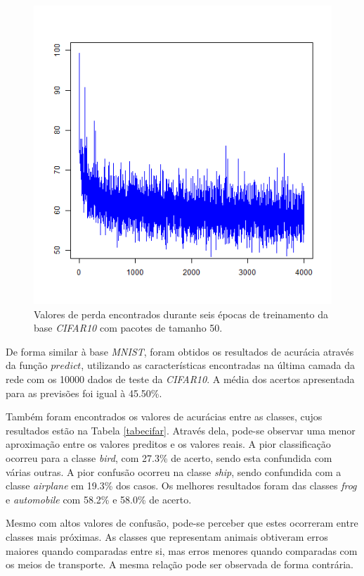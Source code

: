 \documentclass[conference]{IEEEtran}
\begin{document}
\begin{figure}[h]
\centerline{\includegraphics[width=.8\columnwidth]{fig/L_cifar10.png}}
\caption{Valores de perda encontrados durante seis épocas de treinamento da base \textit{CIFAR10} com pacotes de tamanho 50.}
\label{figlcifar}
\end{figure}

De forma similar à base \textit{MNIST}, foram obtidos os resultados de acurácia através da função $predict$, utilizando as características encontradas na última camada da rede com os 10000 dados de teste da \textit{CIFAR10}. A média dos acertos apresentada para as previsões foi igual à 45.50\%.

Também foram encontrados os valores de acurácias entre as classes, cujos resultados estão na Tabela \ref{tabecifar}. Através dela, pode-se observar uma menor aproximação entre os valores preditos e os valores reais. A pior classificação ocorreu para a classe \textit{bird}, com 27.3\% de acerto, sendo esta confundida com várias outras. A pior confusão ocorreu na classe \textit{ship}, sendo confundida com a classe \textit{airplane} em 19.3\% dos casos. Os melhores resultados foram das classes \textit{frog} e \textit{automobile} com 58.2\% e 58.0\% de acerto.

Mesmo com altos valores de confusão, pode-se perceber que estes ocorreram entre classes mais próximas. As classes que representam animais obtiveram erros maiores quando comparadas entre si, mas erros menores quando comparadas com os meios de transporte. A mesma relação pode ser observada de forma contrária.
\end{document}
